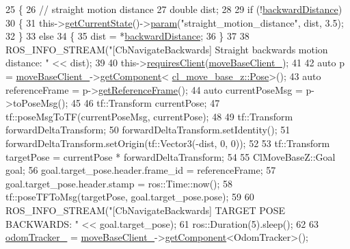 \begin{DoxyCode}
25     \{
26         \textcolor{comment}{// straight motion distance}
27         \textcolor{keywordtype}{double} dist;
28 
29         \textcolor{keywordflow}{if} (!\hyperlink{classcl__move__base__z_1_1CbNavigateBackwards_abb7099e4e18602f6cf06c4f5534a2a15}{backwardDistance})
30         \{
31             this->\hyperlink{classsmacc_1_1SmaccClientBehavior_abf6773e4dd948f932f11a346dd6e7c2c}{getCurrentState}()->\hyperlink{classsmacc_1_1ISmaccState_a4f2ff8e3eda8aa9bbb60c8ff17d0def1}{param}(\textcolor{stringliteral}{"straight\_motion\_distance"}, dist, 3.5);
32         \}
33         \textcolor{keywordflow}{else}
34         \{
35             dist = *\hyperlink{classcl__move__base__z_1_1CbNavigateBackwards_abb7099e4e18602f6cf06c4f5534a2a15}{backwardDistance};
36         \}
37 
38         ROS\_INFO\_STREAM(\textcolor{stringliteral}{"[CbNavigateBackwards] Straight backwards motion distance: "} << dist);
39 
40         this->\hyperlink{classsmacc_1_1SmaccClientBehavior_a917f001e763a1059af337bf4e164f542}{requiresClient}(\hyperlink{classcl__move__base__z_1_1CbNavigateBackwards_a943c1a790eac9266adf11fbdc078f03a}{moveBaseClient\_});
41 
42         \textcolor{keyword}{auto} p = \hyperlink{classcl__move__base__z_1_1CbNavigateBackwards_a943c1a790eac9266adf11fbdc078f03a}{moveBaseClient\_}->\hyperlink{classsmacc_1_1ISmaccClient_adef78db601749ca63c19e74a27cb88cc}{getComponent}<
      \hyperlink{classcl__move__base__z_1_1Pose}{cl\_move\_base\_z::Pose}>();
43         \textcolor{keyword}{auto} referenceFrame = p->\hyperlink{classcl__move__base__z_1_1Pose_af8c2dc151e74aa8da6b283d1c8563051}{getReferenceFrame}();
44         \textcolor{keyword}{auto} currentPoseMsg = p->toPoseMsg();
45 
46         tf::Transform currentPose;
47         tf::poseMsgToTF(currentPoseMsg, currentPose);
48 
49         tf::Transform forwardDeltaTransform;
50         forwardDeltaTransform.setIdentity();
51         forwardDeltaTransform.setOrigin(tf::Vector3(-dist, 0, 0));
52 
53         tf::Transform targetPose = currentPose * forwardDeltaTransform;
54 
55         ClMoveBaseZ::Goal goal;
56         goal.target\_pose.header.frame\_id = referenceFrame;
57         goal.target\_pose.header.stamp = ros::Time::now();
58         tf::poseTFToMsg(targetPose, goal.target\_pose.pose);
59 
60         ROS\_INFO\_STREAM(\textcolor{stringliteral}{"[CbNavigateBackwards] TARGET POSE BACKWARDS: "} << goal.target\_pose);
61         ros::Duration(5).sleep();
62 
63         \hyperlink{classcl__move__base__z_1_1CbNavigateBackwards_a75a8ae7aef6c72e96f4037c4941b0341}{odomTracker\_} = \hyperlink{classcl__move__base__z_1_1CbNavigateBackwards_a943c1a790eac9266adf11fbdc078f03a}{moveBaseClient\_}->\hyperlink{classsmacc_1_1ISmaccClient_adef78db601749ca63c19e74a27cb88cc}{getComponent}<OdomTracker>();

\end{DoxyCode}
